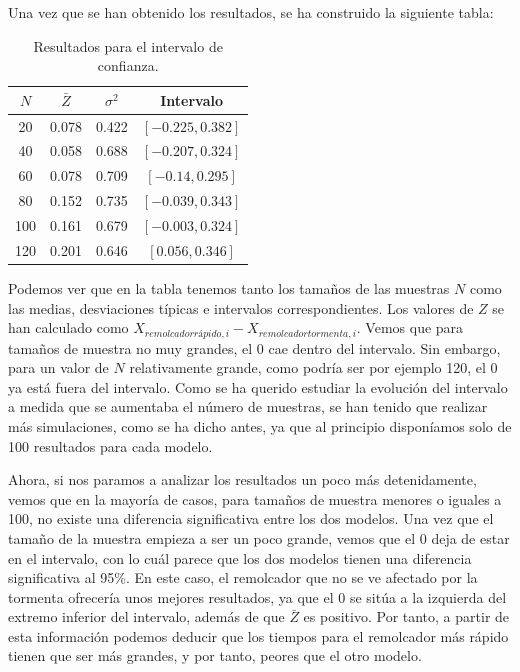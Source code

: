 \documentclass[11pt,a4paper]{article}
\begin{document}
Una vez que se han obtenido los resultados, se ha construido la siguiente
tabla:

\begin{table}[H]
\centering
\begin{tabular}{|c|c|c|c|}
\hline
\textbf{$N$} & \textbf{$\bar{Z}$} & \textbf{$\sigma^2$} & \textbf{Intervalo} \\ \hline
20 & 0.078 & 0.422 & $[-0.225, 0.382]$ \\ \hline
40 & 0.058 & 0.688 & $[-0.207,  0.324]$ \\ \hline
60 & 0.078 & 0.709 & $[-0.14, 0.295]$ \\ \hline
80 & 0.152 & 0.735 & $[-0.039, 0.343]$ \\ \hline
100 & 0.161 & 0.679 & $[-0.003, 0.324]$ \\ \hline
120 & 0.201 & 0.646 & $[0.056, 0.346]$ \\ \hline
\end{tabular}
\caption{Resultados para el intervalo de confianza.}
\label{tab:confianza}
\end{table}

Podemos ver que en la tabla tenemos tanto los tamaños de las muestras $N$
como las medias, desviaciones típicas e intervalos correspondientes. Los valores
de $Z$ se han calculado como $X_{remolcador rápido, i} - X_{remolcador tormenta, i}$.
Vemos que para tamaños de muestra no muy grandes, el 0 cae dentro del intervalo. Sin embargo,
para un valor de $N$ relativamente grande, como podría ser por ejemplo 120, el 0
ya está fuera del intervalo. Como se ha querido estudiar la evolución del intervalo
a medida que se aumentaba el número de muestras, se han tenido que realizar más
simulaciones, como se ha dicho antes, ya que al principio disponíamos solo de
100 resultados para cada modelo.

Ahora, si nos paramos a analizar los resultados un poco más detenidamente,
vemos que en la mayoría de casos, para tamaños de muestra menores o iguales
a 100, no existe una diferencia significativa entre los dos modelos. Una
vez que el tamaño de la muestra empieza a ser un poco grande, vemos que
el 0 deja de estar en el intervalo, con lo cuál parece que los dos modelos
tienen una diferencia significativa al 95\%. En este caso, el remolcador
que no se ve afectado por la tormenta ofrecería unos mejores resultados,
ya que el 0 se sitúa a la izquierda del extremo inferior del intervalo, además
de que $\bar{Z}$ es positivo. Por tanto, a partir de esta información podemos
deducir que los tiempos para el remolcador más rápido tienen que ser más grandes,
y por tanto, peores que el otro modelo.
\end{document}
